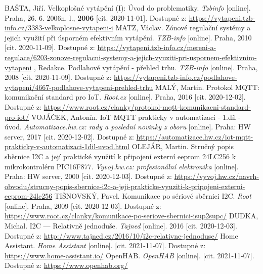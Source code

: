 \begin{thebibliography}{3}
BAŠTA, Jiří. Velkoplošné vytápění (I): Úvod do problematiky. \textit{Tzbinfo} [online]. Praha, 26. 6. 2006n. l., \textbf{2006} [cit. 2020-11-01]. Dostupné z: \url{https://vytapeni.tzb-info.cz/3383-velkoplosne-vytapeni-i}
MATZ, Václav. Zónové regulační systémy a jejich využití při úsporném efektivním vytápění. \textit{TZB-info} [online]. Praha, 2010 [cit. 2020-11-09]. Dostupné z: \url{https://vytapeni.tzb-info.cz/mereni-a-regulace/6203-zonove-regulacni-systemy-a-jejich-vyuziti-pri-uspornem-efektivnim-vytapeni}
, Redakce. Podlahové vytápění - přehled trhu. \textit{TZB-info} [online]. Praha, 2008 [cit. 2020-11-09]. Dostupné z: \url{https://vytapeni.tzb-info.cz/podlahove-vytapeni/4667-podlahove-vytapeni-prehled-trhu}
MALÝ, Martin. Protokol MQTT: komunikační standard pro IoT. \textit{Root.cz} [online]. Praha, 2016 [cit. 2020-12-02]. Dostupné z: \url{https://www.root.cz/clanky/protokol-mqtt-komunikacni-standard-pro-iot/}
VOJÁČEK, Antonín. IoT MQTT prakticky v automatizaci - 1.díl - úvod. \textit{Automatizace.hw.cz: rady a poslední novinky z oboru} [online]. Praha: HW server, 2017 [cit. 2020-12-02]. Dostupné z: \url{https://automatizace.hw.cz/iot-mqtt-prakticky-v-automatizaci-1dil-uvod.html}
OLEJÁR, Martin. Stručný popis sběrnice I2C a její praktické využití k připojení externí eeprom 24LC256 k mikrokontroléru PIC16F877. \textit{Vyvoj.hw.cz: profesionální elektronika} [online]. Praha: HW server, 2000 [cit. 2020-12-03]. Dostupné z: \url{https://vyvoj.hw.cz/navrh-obvodu/strucny-popis-sbernice-i2c-a-jeji-prakticke-vyuziti-k-pripojeni-externi-eeprom-24lc256}
TIŠNOVSKÝ, Pavel. Komunikace po sériové sběrnici I2C. \textit{Root} [online]. Praha, 2009 [cit. 2020-12-03]. Dostupné z: \url{https://www.root.cz/clanky/komunikace-po-seriove-sbernici-isup2supc/}
DUDKA, Michal. I2C --- Relativně jednoduše. \textit{Tajned} [online]. 2016 [cit. 2020-12-03]. Dostupné z: \url{http://www.tajned.cz/2016/10/i2c-relativne-jednoduse/}
Home Assistant. \textit{Home Assistant} [online]. [cit. 2021-11-07]. Dostupné z: \url{https://www.home-assistant.io/}
OpenHAB. \textit{OpenHAB} [online]. [cit. 2021-11-07]. Dostupné z: \url{https://www.openhab.org/}


\end{thebibliography}
